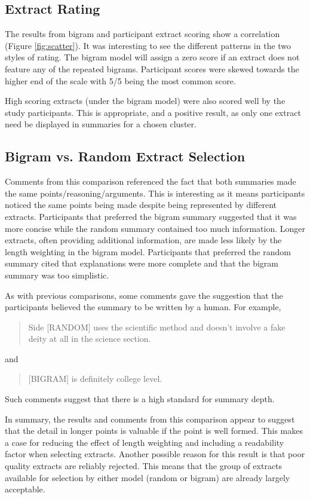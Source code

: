     \tocless\subsection{Extract Rating}
      The results from bigram and participant extract scoring show a correlation (Figure \ref{fig:scatter}). It was interesting to see the different patterns in the two styles of rating. The bigram model will assign a zero score if an extract does not feature any of the repeated bigrams. Participant scores were skewed towards the higher end of the scale with 5/5 being the most common score.

      High scoring extracts (under the bigram model) were also scored well by the study participants. This is appropriate, and a positive result, as only one extract need be displayed in summaries for a chosen cluster.

    \tocless\subsection{Bigram vs. Random Extract Selection}
      Comments from this comparison referenced the fact that both summaries made the same points/reasoning/arguments. This is interesting as it means participants noticed the same points being made despite being represented by different extracts. Participants that preferred the bigram summary suggested that it was more concise while the random summary contained too much information. Longer extracts, often providing additional information, are made less likely by the length weighting in the bigram model. Participants that preferred the random summary cited that explanations were more complete and that the bigram summary was too simplistic.

      As with previous comparisons, some comments gave the suggestion that the participants believed the summary to be written by a human. For example, \blockquote{Side [RANDOM] uses the scientific method and doesn't involve a fake deity at all in the science section.} and \blockquote{[BIGRAM] is definitely college level.}. Such comments suggest that there is a high standard for summary depth.

      In summary, the results and comments from this comparison appear to suggest that the detail in longer points is valuable if the point is well formed. This makes a case for reducing the effect of length weighting and including a readability factor when selecting extracts. Another possible reason for this result is that poor quality extracts are reliably rejected. This means that the group of extracts available for selection by either model (random or bigram) are already largely acceptable.

